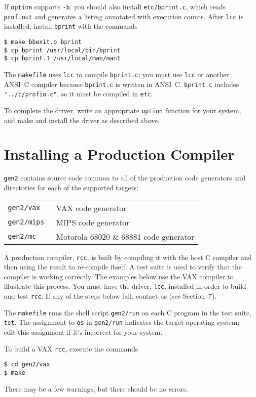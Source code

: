 If \verb|option| supports \verb|-b|, you should also
install \verb|etc/bprint.c|, which reads \verb|prof.out|
and generates a listing annotated with execution counts.
After \verb|lcc| is installed, install \verb|bprint| with the commands
\begin{verbatim}
$ make bbexit.o bprint
$ cp bprint /usr/local/bin/bprint
$ cp bprint.1 /usr/local/man/man1
\end{verbatim}
The \verb|makefile| uses \verb|lcc| to compile \verb|bprint.c|;
you must use \verb|lcc| or another ANSI~C compiler
because \verb|bprint.c| is written in ANSI~C.
\verb|bprint.c| includes \verb|"../c/profio.c"|, so it must
be compiled in \verb|etc|.

To complete the driver,
write an appropriate \verb|option| function for your system,
and make and install the driver as described above.


\section{Installing a Production Compiler}

\verb|gen2| contains source code common to all of the production
code generators and directories for each of the supported targets:

\begin{center}
\begin{tabular}{ll}
\tt gen2/vax	& VAX code generator \\
\tt gen2/mips	& MIPS code generator \\
\tt gen2/mc	& Motorola 68020 \& 68881 code generator \\
\end{tabular}
\end{center}

A production compiler, \verb|rcc|, is built by compiling it
with the host C compiler and then using the result to re-compile itself.
A test suite is used to
verify that the compiler is working correctly.
The examples below use the VAX compiler to illustrate this process.
You must have the driver, \verb|lcc|, installed in order
to build and test \verb|rcc|.
If any of the steps below fail, contact us (see Section~7).

The \verb|makefile| runs the shell script
\verb|gen2/run| on each C program in the test suite, \verb|tst|.
The assignment to \verb|os| in \verb|gen2/run| indicates the target operating
system; edit this assignment if it's incorrect for your system.

To build a VAX \verb|rcc|, execute the commands
\begin{verbatim}
$ cd gen2/vax
$ make
\end{verbatim}
There may be a few warnings, but there should be no errors.


